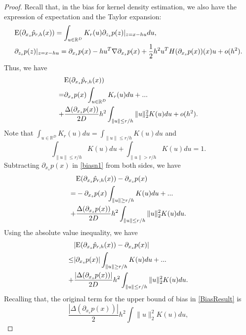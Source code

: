 \documentclass[aos,preprint]{imsart}
\theoremstyle{remark}
\begin{document}
\begin{appendix}
\begin{proof}\label{LKDE bias}
Recall that, in the bias for kernel density estimation, we also have the expression of expectation and the Taylor expansion:
\[
\begin{aligned}
&{\rm E} (\partial_{x_s} \hat{p}_{r,h}(x)) = \int_ {u\in \mathbb{R}^D} K_r(u) \partial_{z_s}p(z)|_{z=x-hu} d u,\\
&\partial_{z_s} p(z)|_{z=x-hu}
= \partial_{x_s} p(x) -  h u^T\nabla \partial_{x_s} p(x) + \frac{1}{2}h^2 u^T H(\partial_{x_s}p(x))(x)u + o(h^2).
\end{aligned}
\]
Thus, we have
\begin{equation}\label{biasn1}
\begin{aligned}
&{\rm E} (\partial_{x_s} \hat{p}_{r,h}(x))  \\
=& \partial_{x_s} p(x) \int_ {u\in \mathbb{R}^D} K_r(u) du+... \\
+& \frac{\Delta(\partial_{x_s}p(x))}{2D} h^2 \int_{\|u\|\leq r/h } \|u\|_2^2 K(u) du + o(h^2).
\end{aligned}
\end{equation}
Note that $\int_{u\in \mathbb{R}^D} K_r(u) du=\int_{\|u\|\leq r/h} K(u) du$ and 
\[
\int_{\|u\|\leq r/h} K(u) du + \int_{\|u\|> r/h} K(u)du =1.
\]
Subtracting $\partial_{x_s}p(x)$ in \eqref{biasn1} from both sides, we have
\begin{equation}\label{biasn2}
\begin{aligned}
&{\rm E}( \partial_{x_s} \hat{p}_{r,h}(x)) -  \partial_{x_s} p(x) \\
= & -\partial_{x_s} p(x) \int_{\|u\|\geq r/h} K(u) du  +...\\
+& \frac{\Delta(\partial_{x_s} p(x))}{2D} h^2 \int_{\|u\|\leq r/h } \|u\|_2^2 K(u) du .
\end{aligned}
\end{equation}
Using the absolute value inequality, we have
\begin{equation}\label{biasn22}
\begin{aligned}
&|{\rm E}( \partial_{x_s} \hat{p}_{r,h}(x)) -  \partial_{x_s} p(x)| \\
\leq &|\partial_{x_s} p(x)| \int_{\|u\|\geq r/h} K(u) du  + ...\\
+&\frac{|\Delta(\partial_{x_s} p(x))|}{2D} h^2 \int_{\|u\|\leq r/h } \|u\|_2^2 K(u) du .
\end{aligned}
\end{equation}
Recalling that, the original term for the upper bound of bias in \eqref{BiasResult} is
\[
\frac{|\Delta(\partial_{x_s}p(x))|}{2} h^2 \int \|u\|_2^2 K(u) du,
\]
\end{proof}
\end{appendix}
\end{document}
